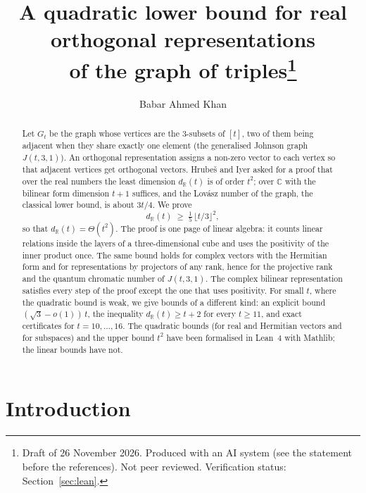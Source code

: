 \documentclass[11pt]{article}
\title{A quadratic lower bound for real orthogonal representations\\ of the graph of triples\thanks{Draft of
26 November 2026. Produced with an AI system (see the statement before the references). Not peer reviewed.
Verification status: Section~\ref{sec:lean}.}}
\author{Babar Ahmed Khan}
\date{}
\theoremstyle{remark}
\newcommand{\R}{\mathbb{R}}
\newcommand{\C}{\mathbb{C}}
\newcommand{\floor}[1]{\lfloor #1\rfloor}
\newcommand{\Gt}{G_t}
\begin{document}
\maketitle

\begin{abstract}
Let $\Gt$ be the graph whose vertices are the $3$-subsets of $[t]$, two of them being adjacent when they share
exactly one element (the generalised Johnson graph $J(t,3,1)$). An orthogonal representation assigns a non-zero
vector to each vertex so that adjacent vertices get orthogonal vectors. Hrube\v{s} and Iyer asked for a proof
that over the real numbers the least dimension $d_\R(t)$ is of order $t^2$; over $\C$ with the bilinear form
dimension $t+1$ suffices, and the Lov\'asz number of the graph, the classical lower bound, is about $3t/4$.
We prove
\[ d_\R(t)\;\ge\;\tfrac15\,\floor{t/3}^2 , \]
so that $d_\R(t)=\Theta(t^2)$. The proof is one page of linear algebra: it counts linear relations inside the
layers of a three-dimensional cube and uses the positivity of the inner product once. The same bound holds for
complex vectors with the Hermitian form and for representations by projectors of any rank, hence for the
projective rank and the quantum chromatic number of $J(t,3,1)$. The complex bilinear representation satisfies
every step of the proof except the one that uses positivity. For small $t$, where the quadratic bound is weak,
we give bounds of a different kind: an explicit bound $(\sqrt3-o(1))\,t$, the inequality $d_\R(t)\ge t+2$ for
every $t\ge 11$, and exact certificates for $t=10,\dots,16$. The quadratic bounds (for real and Hermitian
vectors and for subspaces) and the upper bound $t^2$ have been formalised in Lean~4 with Mathlib; the linear
bounds have not.
\end{abstract}

\section{Introduction}
\end{document}
